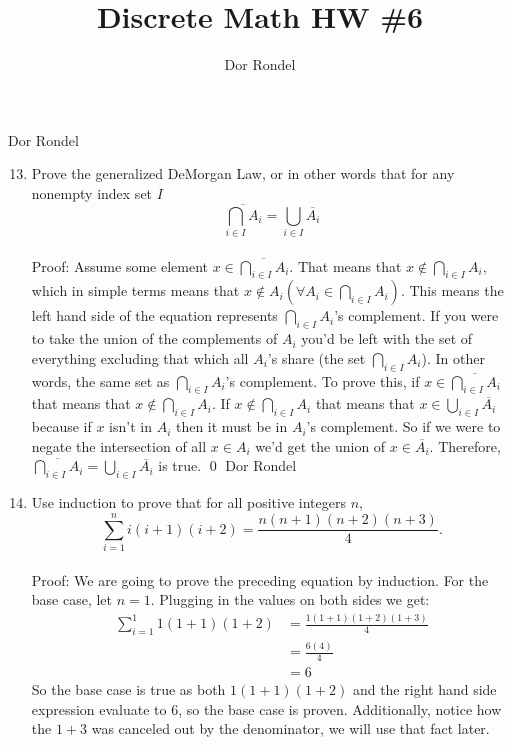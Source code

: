 \documentclass{article}
\title{Discrete Math HW \#6}
\author{Dor Rondel}
\newcommand\tabsmall[1][0.2cm]{\hspace*{#1}}
\begin{document}
\maketitle
\newpage
Dor Rondel \\
\begin{enumerate}
  \setcounter{enumi}{12}
  \item Prove the generalized DeMorgan Law, or in other words that for any nonempty index set $I$
$$\overline{\bigcap_{i \in I} A_i} = \bigcup_{i\in I} \overline{A_i}$$ \\
  \newline
  Proof: Assume some element $x \in \overline{\bigcap_{i \in I} A_i}$. That means that $x \notin \bigcap_{i \in I} A_i$, which in simple terms means that $x \notin A_i (\forall A_i \in \bigcap_{i \in I} A_i)$. This means the left hand side of the equation represents $\bigcap_{i \in I} A_i$'s complement. If you were to take the union of the complements of $A_i$ you'd be left with the set of everything excluding that which all $A_i$'s share (the set \tabsmall $\bigcap_{i \in I} A_i$). In other words, the same set as $\bigcap_{i \in I} A_i$'s complement. To prove this, if $x \in \overline{\bigcap_{i \in I} A_i}$ that means that $x \notin \bigcap_{i \in I} A_i$. If $x \notin \bigcap_{i \in I} A_i$ that means that $x \in \bigcup_{i\in I} \overline{A_i}$ because if $x$ isn't in $A_i$ then it must be in $A_i$'s complement. So if we were to negate the intersection of all $x \in A_i$ we'd get the union of $x \in \overline{A_i}$. Therefore, $\overline{\bigcap_{i \in I} A_i} = \bigcup_{i\in I} \overline{A_i}$ is true. \qed
  \newpage
Dor Rondel \\
  \item Use induction to prove that for all positive integers $n$,
$$ \sum_{i=1}^n i(i+1)(i+2) = \frac{n(n+1)(n+2)(n+3)}{4}.$$ \\
  \newline
  Proof: We are going to prove the preceding equation by induction. For the base case, let $n=1$. Plugging in the values on both sides we get: 
\begin{align*}
\sum_{i=1}^1 1(1+1)(1+2) &= \frac{1(1+1)(1+2)(1+3)}{4} \\
                         &= \frac{6(4)}{4} \\
                         &= 6
\end{align*}
So the base case is true as both $1(1+1)(1+2)$ and the right hand side expression evaluate to 6, so the base case is proven. Additionally, notice how the $1+3$ was canceled out by the denominator, we will use that fact later. \\

\end{enumerate}
\end{document}
